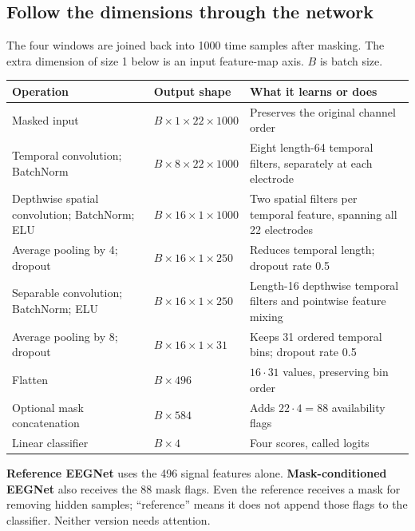 \documentclass[11pt,a4paper]{article}
\begin{document}
\subsection*{Follow the dimensions through the network}
The four windows are joined back into 1000 time samples after masking. The
extra dimension of size 1 below is an input feature-map axis. $B$ is batch size.

\begin{tabularx}{\linewidth}{@{}L{40mm}L{33mm}Y@{}}
\toprule
Operation & Output shape & What it learns or does \\
\midrule
Masked input & $B\times1\times22\times1000$ & Preserves the original channel order \\
Temporal convolution; BatchNorm & $B\times8\times22\times1000$ & Eight length-64 temporal filters, separately at each electrode \\
Depthwise spatial convolution; BatchNorm; ELU & $B\times16\times1\times1000$ & Two spatial filters per temporal feature, spanning all 22 electrodes \\
Average pooling by 4; dropout & $B\times16\times1\times250$ & Reduces temporal length; dropout rate 0.5 \\
Separable convolution; BatchNorm; ELU & $B\times16\times1\times250$ & Length-16 depthwise temporal filters and pointwise feature mixing \\
Average pooling by 8; dropout & $B\times16\times1\times31$ & Keeps 31 ordered temporal bins; dropout rate 0.5 \\
Flatten & $B\times496$ & $16\cdot31$ values, preserving bin order \\
Optional mask concatenation & $B\times584$ & Adds $22\cdot4=88$ availability flags \\
Linear classifier & $B\times4$ & Four scores, called logits \\
\bottomrule
\end{tabularx}

\textbf{Reference EEGNet} uses the 496 signal features alone.
\textbf{Mask-conditioned EEGNet} also receives the 88 mask flags. Even the
reference receives a mask for removing hidden samples; ``reference'' means it
does not append those flags to the classifier. Neither version needs attention.
\end{document}

